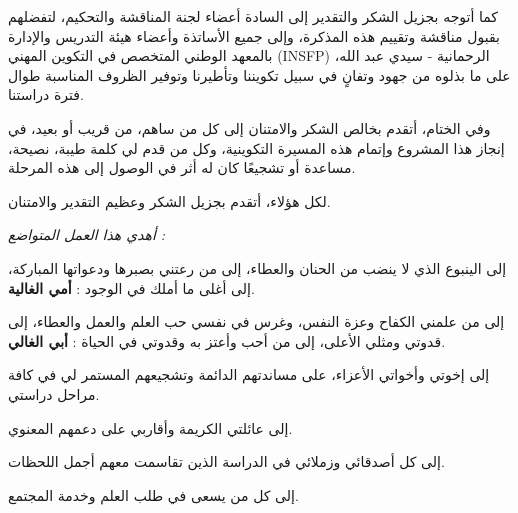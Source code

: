 \documentclass{bts-report-ar}
\begin{document}
\begin{shokr}
كما أتوجه بجزيل الشكر والتقدير إلى السادة أعضاء لجنة المناقشة والتحكيم، لتفضلهم بقبول مناقشة وتقييم هذه المذكرة، وإلى جميع الأساتذة وأعضاء هيئة التدريس والإدارة بالمعهد الوطني المتخصص في التكوين المهني (INSFP) الرحمانية - سيدي عبد الله، على ما بذلوه من جهود وتفانٍ في سبيل تكويننا وتأطيرنا وتوفير الظروف المناسبة طوال فترة دراستنا.

وفي الختام، أتقدم بخالص الشكر والامتنان إلى كل من ساهم، من قريب أو بعيد، في إنجاز هذا المشروع وإتمام هذه المسيرة التكوينية، وكل من قدم لي كلمة طيبة، نصيحة، مساعدة أو تشجيعًا كان له أثر في الوصول إلى هذه المرحلة.

لكل هؤلاء، أتقدم بجزيل الشكر وعظيم التقدير والامتنان.
\end{shokr}

\begin{ihda}
\begin{center}
\vspace*{2cm}
{\itshape
أهدي هذا العمل المتواضع :

إلى الينبوع الذي لا ينضب من الحنان والعطاء، إلى من رعتني بصبرها ودعواتها المباركة، إلى أغلى ما أملك في الوجود : \textbf{أمي الغالية}.

إلى من علمني الكفاح وعزة النفس، وغرس في نفسي حب العلم والعمل والعطاء، إلى قدوتي ومثلي الأعلى، إلى من أحب وأعتز به وقدوتي في الحياة : \textbf{أبي الغالي}.

إلى إخوتي وأخواتي الأعزاء، على مساندتهم الدائمة وتشجيعهم المستمر لي في كافة مراحل دراستي.

إلى عائلتي الكريمة وأقاربي على دعمهم المعنوي.

إلى كل أصدقائي وزملائي في الدراسة الذين تقاسمت معهم أجمل اللحظات.

إلى كل من يسعى في طلب العلم وخدمة المجتمع.
}
\end{center}
\end{ihda}
\end{document}

